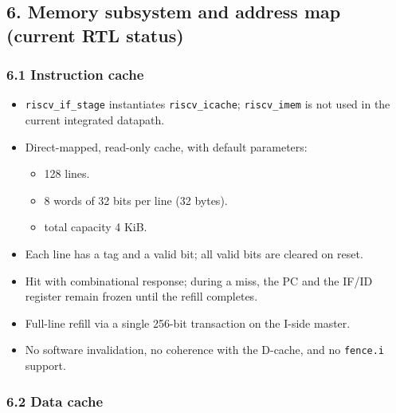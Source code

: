 \documentclass[]{article}
\providecommand{\tightlist}{%
  \setlength{\itemsep}{0pt}\setlength{\parskip}{0pt}}
\begin{document}
\hypertarget{6-memory-subsystem-and-address-map-current-rtl-status}{%
\subsection{6. Memory subsystem and address map (current RTL
status)}\label{6-memory-subsystem-and-address-map-current-rtl-status}}

\hypertarget{61-instruction-cache}{%
\subsubsection{6.1 Instruction cache}\label{61-instruction-cache}}

\begin{itemize}
\tightlist
\item
  \texttt{riscv\_if\_stage} instantiates \texttt{riscv\_icache};
  \texttt{riscv\_imem} is not used in the current integrated datapath.
\item
  Direct-mapped, read-only cache, with default parameters:

  \begin{itemize}
  \tightlist
  \item
    128 lines.
  \item
    8 words of 32 bits per line (32 bytes).
  \item
    total capacity 4 KiB.
  \end{itemize}
\item
  Each line has a tag and a valid bit; all valid bits are cleared on
  reset.
\item
  Hit with combinational response; during a miss, the PC and the IF/ID
  register remain frozen until the refill completes.
\item
  Full-line refill via a single 256-bit transaction on the I-side
  master.
\item
  No software invalidation, no coherence with the D-cache, and no
  \texttt{fence.i} support.
\end{itemize}

\hypertarget{62-data-cache}{%
\subsubsection{6.2 Data cache}\label{62-data-cache}}
\end{document}
